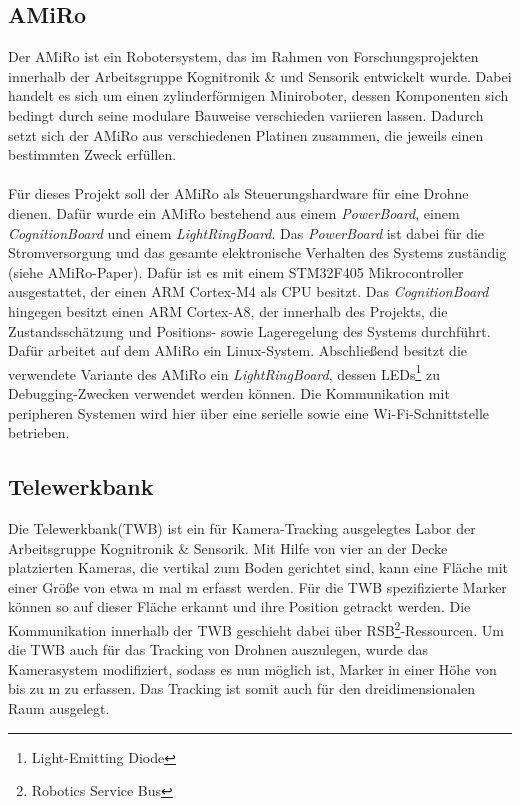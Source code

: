 \subsection{AMiRo}
Der AMiRo ist ein Robotersystem, das im Rahmen von Forschungsprojekten innerhalb der Arbeitsgruppe Kognitronik \& und Sensorik entwickelt wurde. Dabei handelt es sich um einen zylinderförmigen Miniroboter, dessen Komponenten sich bedingt durch seine modulare Bauweise verschieden variieren lassen. Dadurch setzt sich der AMiRo aus verschiedenen Platinen zusammen, die jeweils einen bestimmten Zweck erfüllen.\\\\
Für dieses Projekt soll der AMiRo als Steuerungshardware für eine Drohne dienen. Dafür wurde ein AMiRo bestehend aus einem \textit{PowerBoard}, einem \textit{CognitionBoard} und einem \textit{LightRingBoard}. Das \textit{PowerBoard} ist dabei für die Stromversorgung und das gesamte elektronische Verhalten des Systems zuständig (siehe AMiRo-Paper). Dafür ist es mit einem STM32F405 Mikrocontroller ausgestattet, der einen ARM Cortex-M4 als CPU besitzt. Das \textit{CognitionBoard} hingegen besitzt einen ARM Cortex-A8, der innerhalb des Projekts, die Zustandsschätzung und Positions- sowie Lageregelung des Systems durchführt. Dafür arbeitet auf dem AMiRo ein Linux-System. Abschließend besitzt die verwendete Variante des AMiRo ein \textit{LightRingBoard}, dessen LEDs\footnote{Light-Emitting Diode} zu Debugging-Zwecken verwendet werden können. Die Kommunikation mit peripheren Systemen wird hier über eine serielle sowie eine Wi-Fi-Schnittstelle betrieben.

\subsection{Telewerkbank}
Die Telewerkbank(TWB) ist ein für Kamera-Tracking ausgelegtes Labor der Arbeitsgruppe Kognitronik \& Sensorik. Mit Hilfe von vier an der Decke platzierten Kameras, die vertikal zum Boden gerichtet sind, kann eine Fläche mit einer Größe von etwa \unit[6]{m} mal \unit[6]{m} erfasst werden. Für die TWB spezifizierte Marker können so auf dieser Fläche erkannt und ihre Position getrackt werden. Die Kommunikation innerhalb der TWB geschieht dabei über RSB\footnote{Robotics Service Bus}-Ressourcen. Um die TWB auch für das Tracking von Drohnen auszulegen, wurde das Kamerasystem modifiziert, sodass es nun möglich ist, Marker in einer Höhe von bis zu \unit[1,5]{m} zu erfassen. Das Tracking ist somit auch für den dreidimensionalen Raum ausgelegt.

